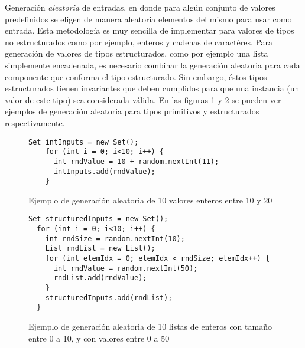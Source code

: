 Generaci\'on \emph{aleatoria} de entradas, en donde para alg\'un conjunto de valores predefinidos se eligen de manera aleatoria elementos del mismo para usar como entrada. Esta metodolog\'ia es muy sencilla de implementar para valores de tipos no estructurados como por ejemplo, enteros y cadenas de caract\'eres. Para generaci\'on de valores de tipos estructurados, como por ejemplo una lista simplemente encadenada, es necesario combinar la generaci\'on aleatoria para cada componente que conforma el tipo estructurado. Sin embargo, \'estos tipos estructurados tienen invariantes que deben cumplidos para que una instancia (un valor de este tipo) sea considerada v\'alida. En las figuras \ref{figures.examples.testing.random.primitive} y \ref{figures.examples.testing.random.structure} se pueden ver ejemplos de generaci\'on aleatoria para tipos primitivos y estructurados respectivamente. %

\begin{figure}
	\begin{lstlisting}[frame=single, mathescape=true,framexleftmargin=1.5em]
    Set intInputs = new Set();
    for (int i = 0; i<10; i++) {
      int rndValue = 10 + random.nextInt(11);
      intInputs.add(rndValue);
    }
	\end{lstlisting}
	\caption{Ejemplo de generaci\'on aleatoria de 10 valores enteros entre 10 y 20}
	\label{figures.examples.testing.random.primitive}
\end{figure}

\begin{figure}
	\begin{lstlisting}[frame=single, mathescape=true,framexleftmargin=1.5em]
  Set structuredInputs = new Set();
  for (int i = 0; i<10; i++) {
    int rndSize = random.nextInt(10);
    List rndList = new List();
    for (int elemIdx = 0; elemIdx < rndSize; elemIdx++) {
      int rndValue = random.nextInt(50);
      rndList.add(rndValue);
    }
    structuredInputs.add(rndList);
  }
	\end{lstlisting}
	\caption{Ejemplo de generaci\'on aleatoria de 10 listas de enteros con tama\~no entre 0 a 10, y con valores entre 0 a 50}
	\label{figures.examples.testing.random.structure}
\end{figure}

